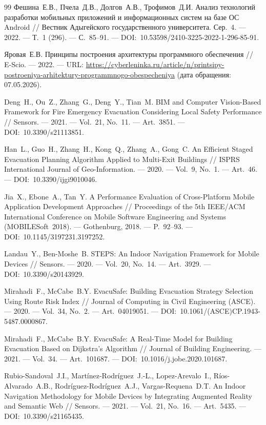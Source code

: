 \begin{thebibliography}{99}
	 Фешина~Е.В., Пчела~Д.В., Долгов~А.В., Трофимов~Д.И. Анализ технологий разработки мобильных приложений и информационных систем на базе ОС Android // Вестник Адыгейского государственного университета. Сер.~4. --- 2022. --- Т.~1 (296). --- С.~85--91. --- DOI:~10.53598/2410-3225-2022-1-296-85-91.
	
	 Яровая~Е.В. Принципы построения архитектуры программного обеспечения // E-Scio. --- 2022. --- URL: \url{https://cyberleninka.ru/article/n/printsipy-postroeniya-arhitektury-programmnogo-obespecheniya} (дата обращения: 07.05.2026).
	
	
	 Deng~H., Ou~Z., Zhang~G., Deng~Y., Tian~M. BIM and Computer Vision-Based Framework for Fire Emergency Evacuation Considering Local Safety Performance // Sensors. --- 2021. --- Vol.~21, No.~11. --- Art.~3851. --- DOI:~10.3390/s21113851.
	
	 Han~L., Guo~H., Zhang~H., Kong~Q., Zhang~A., Gong~C. An Efficient Staged Evacuation Planning Algorithm Applied to Multi-Exit Buildings // ISPRS International Journal of Geo-Information. --- 2020. --- Vol.~9, No.~1. --- Art.~46. --- DOI:~10.3390/ijgi9010046.
	
	 Jia~X., Ebone~A., Tan~Y. A Performance Evaluation of Cross-Platform Mobile Application Development Approaches // Proceedings of the 5th IEEE/ACM International Conference on Mobile Software Engineering and Systems (MOBILESoft~2018). --- Gothenburg, 2018. --- P.~92--93. --- DOI:~10.1145/3197231.3197252.
	
	 Landau~Y., Ben-Moshe~B. STEPS: An Indoor Navigation Framework for Mobile Devices // Sensors. --- 2020. --- Vol.~20, No.~14. --- Art.~3929. --- DOI:~10.3390/s20143929.
	
	 Mirahadi~F., McCabe~B.Y. EvacuSafe: Building Evacuation Strategy Selection Using Route Risk Index // Journal of Computing in Civil Engineering (ASCE). --- 2020. --- Vol.~34, No.~2. --- Art.~04019051. --- DOI:~10.1061/(ASCE)CP.1943-5487.0000867.
	
	 Mirahadi~F., McCabe~B.Y. EvacuSafe: A Real-Time Model for Building Evacuation Based on Dijkstra's Algorithm // Journal of Building Engineering. --- 2021. --- Vol.~34. --- Art.~101687. --- DOI:~10.1016/j.jobe.2020.101687.
	
	 Rubio-Sandoval~J.I., Martínez-Rodríguez~J.-L., Lopez-Arevalo~I., Ríos-Alvarado~A.B., Rodríguez-Rodríguez~A.J., Vargas-Requena~D.T. An Indoor Navigation Methodology for Mobile Devices by Integrating Augmented Reality and Semantic Web // Sensors. --- 2021. --- Vol.~21, No.~16. --- Art.~5435. --- DOI:~10.3390/s21165435.
	

\end{thebibliography}
